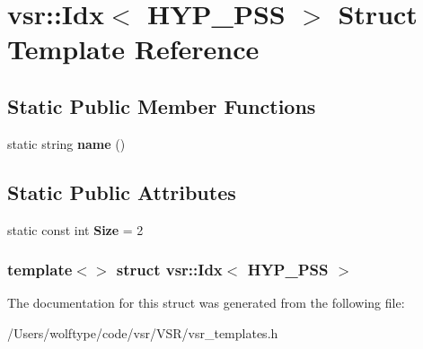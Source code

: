 \hypertarget{structvsr_1_1_idx_3_01_h_y_p___p_s_s_01_4}{\section{vsr\-:\-:Idx$<$ H\-Y\-P\-\_\-\-P\-S\-S $>$ Struct Template Reference}
\label{structvsr_1_1_idx_3_01_h_y_p___p_s_s_01_4}
}
\subsection*{Static Public Member Functions}
\begin{DoxyCompactItemize}
\item 
\hypertarget{structvsr_1_1_idx_3_01_h_y_p___p_s_s_01_4_a682177c90b94159b12da0f5571bf1462}{static string {\bfseries name} ()}\label{structvsr_1_1_idx_3_01_h_y_p___p_s_s_01_4_a682177c90b94159b12da0f5571bf1462}

\end{DoxyCompactItemize}
\subsection*{Static Public Attributes}
\begin{DoxyCompactItemize}
\item 
\hypertarget{structvsr_1_1_idx_3_01_h_y_p___p_s_s_01_4_a78d302dff8bfae2d6bbd31541abe706a}{static const int {\bfseries Size} = 2}\label{structvsr_1_1_idx_3_01_h_y_p___p_s_s_01_4_a78d302dff8bfae2d6bbd31541abe706a}

\end{DoxyCompactItemize}
\subsubsection*{template$<$$>$ struct vsr\-::\-Idx$<$ H\-Y\-P\-\_\-\-P\-S\-S $>$}



The documentation for this struct was generated from the following file\-:\begin{DoxyCompactItemize}
\item 
/\-Users/wolftype/code/vsr/\-V\-S\-R/vsr\-\_\-templates.\-h\end{DoxyCompactItemize}
